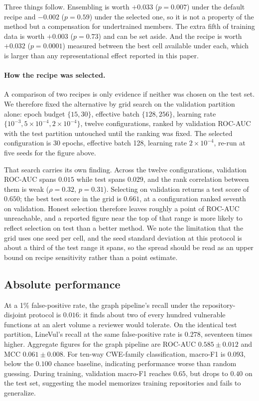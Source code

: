 \noindent Three things follow. Ensembling is worth $+0.033$ ($p=0.007$) under
the default recipe and $-0.002$ ($p=0.59$) under the selected one, so it is not
a property of the method but a compensation for undertrained members. The extra
fifth of training data is worth $+0.003$ ($p=0.73$) and can be set aside. And
the recipe is worth $+0.032$ ($p=0.0001$) measured between the best cell
available under each, which is larger than any representational effect reported
in this paper.

\paragraph{How the recipe was selected.} A comparison of two recipes is only
evidence if neither was chosen on the test set. We therefore fixed the
alternative by grid search on the validation partition alone: epoch budget
$\{15, 30\}$, effective batch $\{128, 256\}$, learning rate
$\{10^{-3}, 5\times10^{-4}, 2\times10^{-4}\}$, twelve configurations, ranked by
validation ROC-AUC with the test partition untouched until the ranking was
fixed. The selected configuration is 30 epochs, effective batch 128, learning
rate $2\times10^{-4}$, re-run at five seeds for the figure above.

That search carries its own finding. Across the twelve configurations,
validation ROC-AUC spans $0.015$ while test spans $0.029$, and the rank
correlation between them is weak ($\rho=0.32$, $p=0.31$). Selecting on
validation returns a test score of $0.650$; the best test score in the grid is
$0.661$, at a configuration ranked seventh on validation. Honest selection
therefore leaves roughly a point of ROC-AUC unreachable, and a reported figure
near the top of that range is more likely to reflect selection on test than a
better method. We note the limitation that the grid uses one seed per cell, and
the seed standard deviation at this protocol is about a third of the test range
it spans, so the spread should be read as an upper bound on recipe sensitivity
rather than a point estimate.

\subsection{Absolute performance}
At a 1\% false-positive rate, the graph pipeline's recall under the
repository-disjoint protocol is \textbf{$0.016$}: it finds about two of every
hundred vulnerable functions at an alert volume a reviewer would tolerate. On
the identical test partition, LineVul's recall at the same false-positive rate
is \textbf{$0.278$}, seventeen times higher. Aggregate figures for the graph
pipeline are ROC-AUC $0.585 \pm 0.012$ and MCC $0.061 \pm 0.008$. For ten-way CWE-family classification, macro-F1 is $0.093$, below the $0.100$ chance baseline, indicating performance worse than random guessing. During training, validation macro-F1 reaches $0.65$, but drops to $0.40$ on the test set, suggesting the model memorizes training repositories and fails to generalize.

